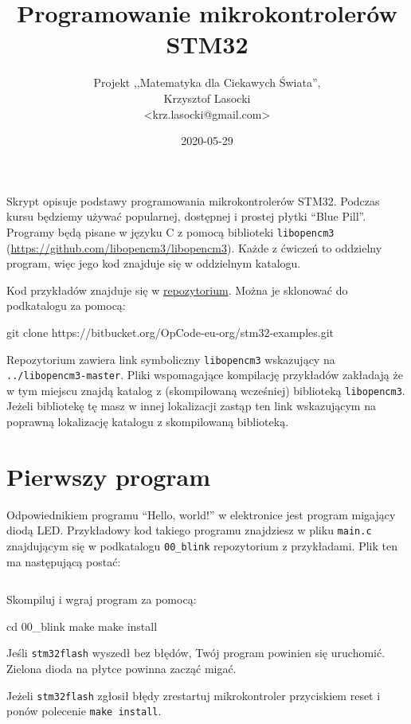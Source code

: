 \documentclass{pdfBooklets}
\title{Programowanie mikrokontrolerów STM32}
\author{%
	Projekt ,,Matematyka dla Ciekawych Świata'',\\
	Krzysztof Lasocki\\\normalsize\ttfamily <krz.lasocki@gmail.com>
}
\date  {2020-05-29}
\begin{document}
\maketitle

Skrypt opisuje podstawy programowania mikrokontrolerów STM32. Podczas kursu będziemy używać
popularnej, dostępnej i prostej płytki ``Blue Pill''. Programy będą pisane w języku
C z pomocą biblioteki \Verb$libopencm3$ (\url{https://github.com/libopencm3/libopencm3}).
Każde z ćwiczeń to oddzielny program, więc jego kod znajduje się w oddzielnym katalogu.

Kod przykładów znajduje się w \hyperref[repo]{repozytorium}. Można je sklonować do podkatalogu za pomocą:

\begin{CodeFrame*}[bash]{}
  git clone https://bitbucket.org/OpCode-eu-org/stm32-examples.git
\end{CodeFrame*}

Repozytorium zawiera link symboliczny \Verb$libopencm3$ wskazujący na \Verb$../libopencm3-master$.
Pliki wspomagające kompilację przykładów zakładają że w tym miejscu znajdą katalog z (skompilowaną wcześniej) biblioteką \Verb$libopencm3$.
Jeżeli bibliotekę tę masz w innej lokalizacji zastąp ten link wskazującym na poprawną lokalizację katalogu z skompilowaną biblioteką.


\section{Pierwszy program}
Odpowiednikiem programu ``Hello, world!'' w elektronice jest program migający diodą LED.
Przykładowy kod takiego programu znajdziesz w pliku \Verb$main.c$ znajdującym się w podkatalogu \Verb$00_blink$ repozytorium z przykładami.
Plik ten ma następującą postać:

\inputminted[frame=single,firstline=6]{c}{stm32-examples/00_blink/main.c}

Skompiluj i wgraj program za pomocą:

\begin{CodeFrame*}[bash]{}
cd 00_blink
make
make install
\end{CodeFrame*}

Jeśli \Verb$stm32flash$ wyszedł bez błędów, Twój program powinien się uruchomić. Zielona dioda na płytce powinna zacząć migać.

Jeżeli \Verb$stm32flash$ zgłosił błędy zrestartuj mikrokontroler przyciskiem reset i ponów polecenie \Verb$make install$.
\end{document}
